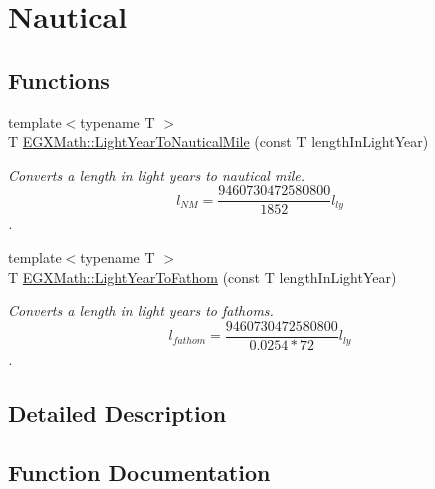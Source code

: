 \hypertarget{group___e_g_x_math-_conversions-_length_conversions-_astronomical-_light_year-_nautical}{}\section{Nautical}
\label{group___e_g_x_math-_conversions-_length_conversions-_astronomical-_light_year-_nautical}
\subsection*{Functions}
\begin{DoxyCompactItemize}
\item 
{\footnotesize template$<$typename T $>$ }\\T \mbox{\hyperlink{group___e_g_x_math-_conversions-_length_conversions-_astronomical-_light_year-_nautical_ga0195b6c7d9efe06bed6d571046d485b4}{E\+G\+X\+Math\+::\+Light\+Year\+To\+Nautical\+Mile}} (const T length\+In\+Light\+Year)
\begin{DoxyCompactList}\small\item\em Converts a length in light years to nautical mile. \[ l_{NM}= \frac{9460730472580800}{1852} l_{ly} \]. \end{DoxyCompactList}\item 
{\footnotesize template$<$typename T $>$ }\\T \mbox{\hyperlink{group___e_g_x_math-_conversions-_length_conversions-_astronomical-_light_year-_nautical_gad53c415df3fcb65654ccf0d1cd79ef4a}{E\+G\+X\+Math\+::\+Light\+Year\+To\+Fathom}} (const T length\+In\+Light\+Year)
\begin{DoxyCompactList}\small\item\em Converts a length in light years to fathoms. \[ l_{fathom}= \frac{9460730472580800}{0.0254 * 72} l_{ly} \]. \end{DoxyCompactList}\end{DoxyCompactItemize}


\subsection{Detailed Description}


\subsection{Function Documentation}
\mbox{\label{group___e_g_x_math-_conversions-_length_conversions-_astronomical-_light_year-_nautical_gad53c415df3fcb65654ccf0d1cd79ef4a}} 
